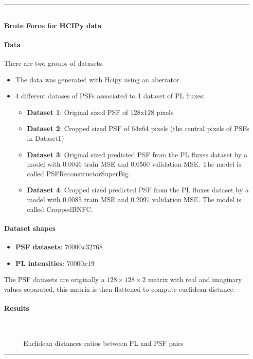 \rule{0.5\textwidth}{0.5pt}\\

	{\large \textbf{Brute Force for HCIPy data}}\\
	
	\paragraph{Data}
	
	There are two groups of datasets.
	\begin{itemize}
		\item The data was generated with Hcipy using an  aberrator.
		\item 4 different datases of PSFs associated to 1 dataset of PL fluxes:
		\begin{itemize}
			\item \textbf{Dataset 1}: Original sized PSF of 128x128 pixels
			\item \textbf{Dataset 2}: Cropped sized PSF of 64x64 pixels (the central pixels of PSFs in Dataset1)
			\item \textbf{Dataset 3}: Original sized predicted PSF from the PL fluxes dataset by a model with 0.0046 train MSE and 0.0560 validation MSE. The model is called PSFReconstructorSuperBig.
			\item \textbf{Dataset 4}: Cropped sized predicted PSF from the PL fluxes dataset by a model with 0.0085 train MSE and 0.2097 validation MSE. The model is called CroppedBNFC.
		\end{itemize}
	\end{itemize}
	
	\paragraph{Dataset shapes}
	\begin{itemize}
		\item \textbf{PSF datasets}: $70000x32768$ 
		\item \textbf{PL intensities}: $70000x19$
	\end{itemize}
	
	The PSF datasets are originally a $128\times128\times2$ matrix with real and imaginary values separated, this matrix is then flattened to compute euclidean distance.
	
	\paragraph{Results}
	
	\begin{figure*}[ht!]
		\centering
		\\
		\caption{Euclidean distances ratios between PL and PSF pairs}\hspace{\fill}
	\end{figure*}
	
\FloatBarrier	
\rule{0.5\textwidth}{0.5pt}\\